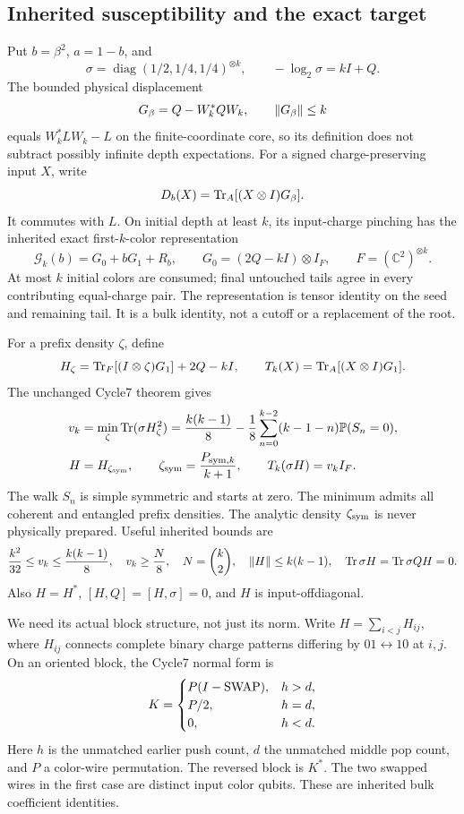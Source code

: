 \subsection{Inherited susceptibility and the exact target}

Put \(b=\beta^2\), \(a=1-b\), and
\[
 \sigma=\operatorname{diag}(1/2,1/4,1/4)^{\otimes k},
 \qquad-\log_2\sigma=kI+Q.
\]
The bounded physical displacement
\[
 G_\beta=Q-W_k^*QW_k,\qquad \lVert G_\beta\rVert\le k
\]
equals \(W_k^*LW_k-L\) on the finite-coordinate core, so its definition
does not subtract possibly infinite depth expectations.
For a signed charge-preserving input \(X\), write
\[
 D_b(X)=\operatorname{Tr}_A[(X\otimes I)G_\beta].
\]
It commutes with \(L\). On initial depth at least \(k\), its input-charge
pinching has the inherited exact first-\(k\)-color representation
\[
 \mathcal G_k(b)=G_0+bG_1+R_b,\qquad
 G_0=(2Q-kI)\otimes I_F,\qquad F=(\mathbb C^2)^{\otimes k}.
\]
At most \(k\) initial colors are consumed; final untouched tails agree in
every contributing equal-charge pair. The representation is tensor identity
on the seed and remaining tail. It is a bulk identity, not a cutoff or a
replacement of the root.

For a prefix density \(\zeta\), define
\[
 H_\zeta=\operatorname{Tr}_F[(I\otimes\zeta)G_1]+2Q-kI,\qquad
 T_k(X)=\operatorname{Tr}_A[(X\otimes I)G_1].
\]
The unchanged Cycle7 theorem gives
\begin{align}
 v_k&=\min_{\zeta}\operatorname{Tr}(\sigma H_\zeta^2)
 =\frac{k(k-1)}8-\frac18
   \sum_{n=0}^{k-2}(k-1-n)\mathbb P(S_n=0),\label{eq:vk}\\
 H&=H_{\zeta_{\rm sym}},\qquad
 \zeta_{\rm sym}=\frac{P_{{\rm sym},k}}{k+1},
 \qquad T_k(\sigma H)=v_kI_F.\label{eq:scalar}
\end{align}
The walk \(S_n\) is simple symmetric and starts at zero. The minimum admits
all coherent and entangled prefix densities. The analytic density
\(\zeta_{\rm sym}\) is never physically prepared. Useful inherited bounds are
\begin{equation}\label{eq:inherited}
 \frac{k^2}{32}\le v_k\le\frac{k(k-1)}8,\quad
 v_k\ge\frac N8,\quad N=\binom{k}{2},\quad
 \lVert H\rVert\le k(k-1),\quad
 \operatorname{Tr}\sigma H=\operatorname{Tr}\sigma QH=0.
\end{equation}
Also \(H=H^*\), \([H,Q]=[H,\sigma]=0\), and \(H\) is input-offdiagonal.

We need its actual block structure, not just its norm. Write
\(H=\sum_{i<j}H_{ij}\), where \(H_{ij}\) connects complete binary charge
patterns differing by \(01\leftrightarrow10\) at \(i,j\).
On an oriented block, the Cycle7 normal form is
\begin{equation}\label{eq:Hblocks}
 K=
 \begin{cases}
 P(I-\operatorname{SWAP}),&h>d,\\
 P/2,&h=d,\\
 0,&h<d.
 \end{cases}
\end{equation}
Here \(h\) is the unmatched earlier push count, \(d\) the unmatched
middle pop count, and \(P\) a color-wire permutation. The reversed block
is \(K^*\). The two swapped wires in the first case are distinct input
color qubits. These are inherited bulk coefficient identities.

